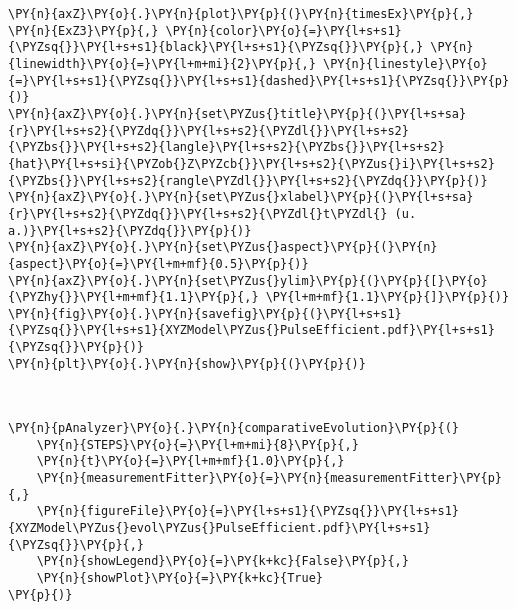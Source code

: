 \begin{tcolorbox}[breakable, size=fbox, boxrule=1pt, pad at break*=1mm,colback=cellbackground, colframe=cellborder]
\begin{Verbatim}[commandchars=\\\{\}]
\PY{n}{axZ}\PY{o}{.}\PY{n}{plot}\PY{p}{(}\PY{n}{timesEx}\PY{p}{,} \PY{n}{ExZ3}\PY{p}{,} \PY{n}{color}\PY{o}{=}\PY{l+s+s1}{\PYZsq{}}\PY{l+s+s1}{black}\PY{l+s+s1}{\PYZsq{}}\PY{p}{,} \PY{n}{linewidth}\PY{o}{=}\PY{l+m+mi}{2}\PY{p}{,} \PY{n}{linestyle}\PY{o}{=}\PY{l+s+s1}{\PYZsq{}}\PY{l+s+s1}{dashed}\PY{l+s+s1}{\PYZsq{}}\PY{p}{)}
\PY{n}{axZ}\PY{o}{.}\PY{n}{set\PYZus{}title}\PY{p}{(}\PY{l+s+sa}{r}\PY{l+s+s2}{\PYZdq{}}\PY{l+s+s2}{\PYZdl{}}\PY{l+s+s2}{\PYZbs{}}\PY{l+s+s2}{langle}\PY{l+s+s2}{\PYZbs{}}\PY{l+s+s2}{hat}\PY{l+s+si}{\PYZob{}Z\PYZcb{}}\PY{l+s+s2}{\PYZus{}i}\PY{l+s+s2}{\PYZbs{}}\PY{l+s+s2}{rangle\PYZdl{}}\PY{l+s+s2}{\PYZdq{}}\PY{p}{)}
\PY{n}{axZ}\PY{o}{.}\PY{n}{set\PYZus{}xlabel}\PY{p}{(}\PY{l+s+sa}{r}\PY{l+s+s2}{\PYZdq{}}\PY{l+s+s2}{\PYZdl{}t\PYZdl{} (u. a.)}\PY{l+s+s2}{\PYZdq{}}\PY{p}{)}
\PY{n}{axZ}\PY{o}{.}\PY{n}{set\PYZus{}aspect}\PY{p}{(}\PY{n}{aspect}\PY{o}{=}\PY{l+m+mf}{0.5}\PY{p}{)}
\PY{n}{axZ}\PY{o}{.}\PY{n}{set\PYZus{}ylim}\PY{p}{(}\PY{p}{[}\PY{o}{\PYZhy{}}\PY{l+m+mf}{1.1}\PY{p}{,} \PY{l+m+mf}{1.1}\PY{p}{]}\PY{p}{)}
\PY{n}{fig}\PY{o}{.}\PY{n}{savefig}\PY{p}{(}\PY{l+s+s1}{\PYZsq{}}\PY{l+s+s1}{XYZModel\PYZus{}PulseEfficient.pdf}\PY{l+s+s1}{\PYZsq{}}\PY{p}{)}
\PY{n}{plt}\PY{o}{.}\PY{n}{show}\PY{p}{(}\PY{p}{)}
\end{Verbatim}
\end{tcolorbox}

    \begin{center}
    \end{center}
    { \hspace*{\fill} \\}
    
    \begin{tcolorbox}[breakable, size=fbox, boxrule=1pt, pad at break*=1mm,colback=cellbackground, colframe=cellborder]
\begin{Verbatim}[commandchars=\\\{\}]
\PY{n}{pAnalyzer}\PY{o}{.}\PY{n}{comparativeEvolution}\PY{p}{(}
    \PY{n}{STEPS}\PY{o}{=}\PY{l+m+mi}{8}\PY{p}{,} 
    \PY{n}{t}\PY{o}{=}\PY{l+m+mf}{1.0}\PY{p}{,}
    \PY{n}{measurementFitter}\PY{o}{=}\PY{n}{measurementFitter}\PY{p}{,}
    \PY{n}{figureFile}\PY{o}{=}\PY{l+s+s1}{\PYZsq{}}\PY{l+s+s1}{XYZModel\PYZus{}evol\PYZus{}PulseEfficient.pdf}\PY{l+s+s1}{\PYZsq{}}\PY{p}{,}
    \PY{n}{showLegend}\PY{o}{=}\PY{k+kc}{False}\PY{p}{,}
    \PY{n}{showPlot}\PY{o}{=}\PY{k+kc}{True}
\PY{p}{)}
\end{Verbatim}
\end{tcolorbox}

